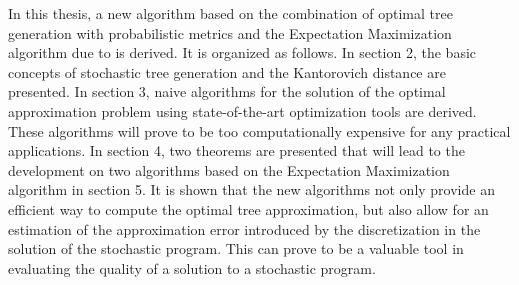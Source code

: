 In this thesis, a new algorithm based on the combination of optimal tree generation with probabilistic metrics and the Expectation Maximization algorithm due to \cite{Dempster1977} is derived. It is organized as follows. In section 2, the basic concepts of stochastic tree generation and the Kantorovich distance are presented. In section 3, naive algorithms for the solution of the optimal approximation problem using state-of-the-art optimization tools are derived. These algorithms will prove to be too computationally expensive for any practical applications. In section 4, two theorems are presented that will lead to the development on two algorithms based on the Expectation Maximization algorithm in section 5. It is shown that the new algorithms not only provide an efficient way to compute the optimal tree approximation, but also allow for an estimation of the approximation error introduced by the discretization in the solution of the stochastic program. This can prove to be a valuable tool in evaluating the quality of a solution to a stochastic program.
